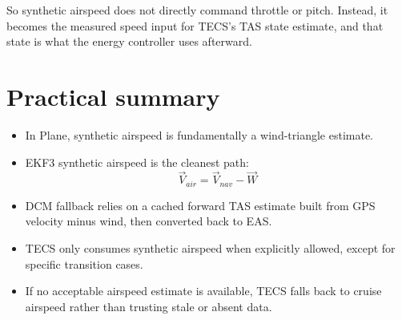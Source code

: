 \documentclass[11pt]{article}
\begin{document}
So synthetic airspeed does not directly command throttle or pitch. Instead, it becomes the measured speed input for TECS's TAS state estimate, and that state is what the energy controller uses afterward.

\section{Practical summary}

\begin{itemize}
    \item In Plane, synthetic airspeed is fundamentally a wind-triangle estimate.
    \item EKF3 synthetic airspeed is the cleanest path:
    \[
    \vec{V}_{air} = \vec{V}_{nav} - \vec{W}
    \]
    \item DCM fallback relies on a cached forward TAS estimate built from GPS velocity minus wind, then converted back to EAS.
    \item TECS only consumes synthetic airspeed when explicitly allowed, except for specific transition cases.
    \item If no acceptable airspeed estimate is available, TECS falls back to cruise airspeed rather than trusting stale or absent data.
\end{itemize}
\end{document}
